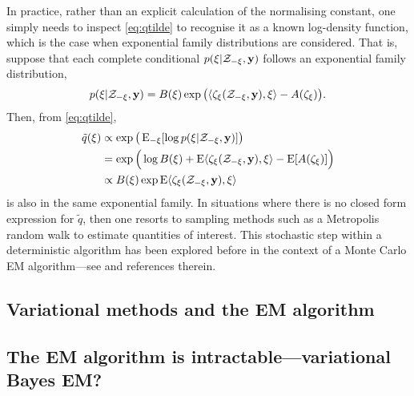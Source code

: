 In practice, rather than an explicit calculation of the normalising constant, one simply needs to inspect \cref{eq:qtilde} to recognise it as a known log-density function, which is the case when exponential family distributions are considered.
That is, suppose that each complete conditional $p(\xi|{\mathcal Z}_{-\xi}, {\mathbf y})$ follows an exponential family distribution,
\[
  p(\xi|{\mathcal Z}_{-\xi}, {\mathbf y}) = B(\xi)\exp \big(\langle\zeta_\xi({\mathcal Z}_{-\xi}, {\mathbf y}) , \xi\rangle - A(\zeta_\xi) \big).
\]
Then, from \cref{eq:qtilde},
\begin{align*}
  \tilde q(\xi)
  &\propto \exp\big(\operatorname{E}_{-\xi}[\log p(\xi|{\mathcal Z}_{-\xi}, {\mathbf y})] \big) \\
  &= \exp \Big(\log B(\xi) + \operatorname{E} \langle\zeta_\xi({\mathcal Z}_{-\xi}, {\mathbf y}) , \xi\rangle - \operatorname{E} [ A(\zeta_\xi) ] \Big) \\
  &\propto B(\xi)\exp \operatorname{E}\langle\zeta_\xi({\mathcal Z}_{-\xi}, {\mathbf y}) , \xi\rangle
\end{align*}
is also in the same exponential family.
In situations where there is no closed form expression for $\tilde q$, then one resorts to sampling methods such as a Metropolis random walk to estimate quantities of interest.
This stochastic step within a deterministic algorithm has been explored before in the context of a Monte Carlo EM algorithm---see \citet[§4, pp. 537--538]{meng1997algorithm} and references therein.

\subsection{Variational methods and the EM algorithm}


\subsection{The EM algorithm is intractable---variational Bayes EM?}


